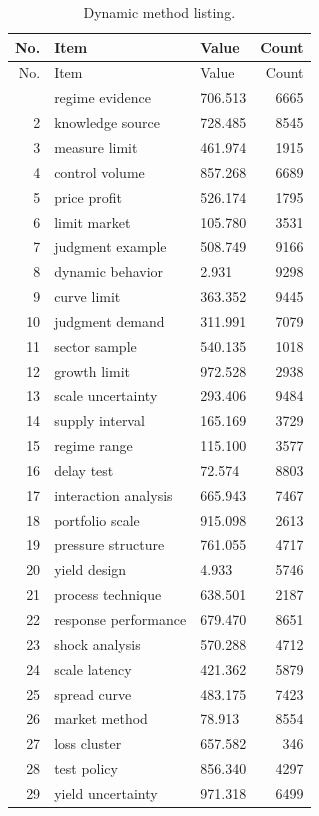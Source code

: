 \documentclass[11pt]{report}
\begin{document}
\begin{longtable}{rllr}\caption{Dynamic method listing.}\label{tab:l7}\\\toprule No. & Item & Value & Count \\ \midrule \endfirsthead\toprule No. & Item & Value & Count \\ \midrule \endhead\bottomrule \endfoot
1 & regime evidence & 706.513 & 6665 \\
2 & knowledge source & 728.485 & 8545 \\
3 & measure limit & 461.974 & 1915 \\
4 & control volume & 857.268 & 6689 \\
5 & price profit & 526.174 & 1795 \\
6 & limit market & 105.780 & 3531 \\
7 & judgment example & 508.749 & 9166 \\
8 & dynamic behavior & 2.931 & 9298 \\
9 & curve limit & 363.352 & 9445 \\
10 & judgment demand & 311.991 & 7079 \\
11 & sector sample & 540.135 & 1018 \\
12 & growth limit & 972.528 & 2938 \\
13 & scale uncertainty & 293.406 & 9484 \\
14 & supply interval & 165.169 & 3729 \\
15 & regime range & 115.100 & 3577 \\
16 & delay test & 72.574 & 8803 \\
17 & interaction analysis & 665.943 & 7467 \\
18 & portfolio scale & 915.098 & 2613 \\
19 & pressure structure & 761.055 & 4717 \\
20 & yield design & 4.933 & 5746 \\
21 & process technique & 638.501 & 2187 \\
22 & response performance & 679.470 & 8651 \\
23 & shock analysis & 570.288 & 4712 \\
24 & scale latency & 421.362 & 5879 \\
25 & spread curve & 483.175 & 7423 \\
26 & market method & 78.913 & 8554 \\
27 & loss cluster & 657.582 & 346 \\
28 & test policy & 856.340 & 4297 \\
29 & yield uncertainty & 971.318 & 6499 \\

\end{longtable}
\end{document}
